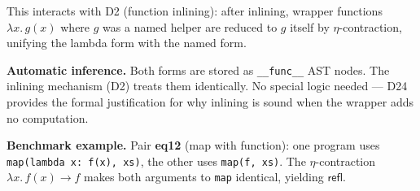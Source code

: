 This interacts with D2 (function inlining): after inlining, wrapper
functions $\lambda x.\, g(x)$ where $g$ was a named helper are
reduced to $g$ itself by $\eta$-contraction, unifying the lambda
form with the named form.

\textbf{Automatic inference.}
Both forms are stored as \texttt{\_\_func\_\_} AST nodes.  The
inlining mechanism (D2) treats them identically.  No special logic
needed --- D24 provides the formal justification for why inlining
is sound when the wrapper adds no computation.

\textbf{Benchmark example.}
Pair \textbf{eq12} (map with function): one program uses
\texttt{map(lambda x: f(x), xs)}, the other uses
\texttt{map(f, xs)}.  The $\eta$-contraction
$\lambda x.\, f(x) \to f$ makes both arguments to \texttt{map}
identical, yielding $\mathsf{refl}$.


